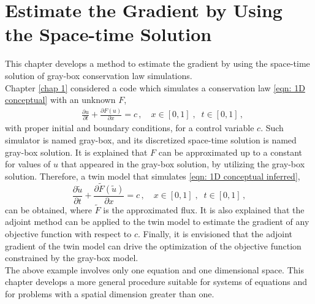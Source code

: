 \chapter{Estimate the Gradient by Using the Space-time Solution}
\label{chapter 2}
This chapter develops a method to estimate the gradient by using the space-time solution
of gray-box conservation law simulations.\\

Chapter \ref{chap 1} considered a code which simulates a conservation law 
\eqref{eqn: 1D conceptual} with an unknown $F$,
\begin{equation*}\begin{split}
    &\frac{\partial u}{\partial t} + \frac{\partial F(u)}{\partial x} = c\,,\quad
    x \in [0,1] \;, \;\; t\in[0,1]\,,
    \label{eqn: 1D conceptual repeat}
\end{split}\end{equation*}
with proper initial and boundary conditions, for a control variable
$c$.
Such simulator is named gray-box, and its discretized space-time solution is named gray-box solution. 
It is explained that $F$ can be approximated up to 
a constant for values of $u$
that appeared in the gray-box solution, by utilizing the gray-box solution.
Therefore, a twin model that simulates \eqref{eqn: 1D conceptual inferred},
\begin{equation*}
    \frac{\partial \tilde{u}}{\partial t} + \frac{\partial \tilde{F}(\tilde{u})}{\partial x} = c\,,\quad
    x \in [0,1] \;, \;\; t\in[0,1]\,,
    \label{eqn: 1D conceptual inferred repeat}
\end{equation*}
can be obtained, where $\tilde{F}$ is the approximated flux. 
It is also explained that the adjoint method can be applied to the twin model to estimate the gradient of 
any objective function with respect to $c$. 
Finally, it is envisioned that the adjoint gradient of the twin model can drive the optimization of 
the objective function constrained by the gray-box model.\\


The above example involves only one equation and one dimensional space.
This chapter develops a more general
procedure suitable for systems of equations and for problems with a spatial dimension greater than one.

